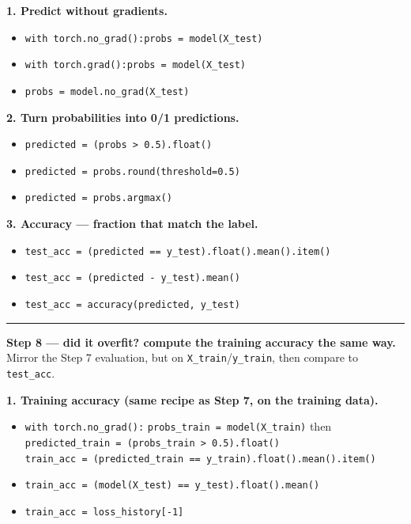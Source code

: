 \documentclass[11pt]{article}
\newcommand{\opt}[1]{\texttt{#1}}
\begin{document}
\textbf{1. Predict without gradients.}
\begin{itemize}
  \item[(a)] \opt{with torch.no\_grad():}\quad\opt{probs = model(X\_test)}
  \item[(b)] \opt{with torch.grad():}\quad\opt{probs = model(X\_test)}
  \item[(c)] \opt{probs = model.no\_grad(X\_test)}
\end{itemize}

\textbf{2. Turn probabilities into 0/1 predictions.}
\begin{itemize}
  \item[(a)] \opt{predicted = (probs > 0.5).float()}
  \item[(b)] \opt{predicted = probs.round(threshold=0.5)}
  \item[(c)] \opt{predicted = probs.argmax()}
\end{itemize}

\textbf{3. Accuracy --- fraction that match the label.}
\begin{itemize}
  \item[(a)] \opt{test\_acc = (predicted == y\_test).float().mean().item()}
  \item[(b)] \opt{test\_acc = (predicted - y\_test).mean()}
  \item[(c)] \opt{test\_acc = accuracy(predicted, y\_test)}
\end{itemize}

\vspace{4pt}\hrule\vspace{4pt}

\textbf{Step 8 --- did it overfit? compute the training accuracy the same way.}\; {\small Mirror the
Step 7 evaluation, but on \opt{X\_train}/\opt{y\_train}, then compare to \opt{test\_acc}.}

\textbf{1. Training accuracy (same recipe as Step 7, on the training data).}
\begin{itemize}
  \item[(a)] {\small\opt{with torch.no\_grad():}\; \opt{probs\_train = model(X\_train)}\; then}\\
        \hspace*{1.2em}\opt{predicted\_train = (probs\_train > 0.5).float()}\\
        \hspace*{1.2em}\opt{train\_acc = (predicted\_train == y\_train).float().mean().item()}
  \item[(b)] \opt{train\_acc = (model(X\_test) == y\_test).float().mean()}
  \item[(c)] \opt{train\_acc = loss\_history[-1]}
\end{itemize}
\end{document}
